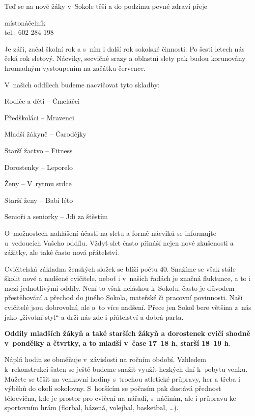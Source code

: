 \documentclass[11pt]{article}
\begin{document}
Teď se na nové žáky v~Sokole těší a do podzimu pevné zdraví přeje

\signature{Jiří Novák (Jirkan)}{místonáčelník\\tel.: 602 284 198}

\vspace*{24pt}

Je září, začal školní rok a s~ním i další rok sokolské činnosti. Po šesti letech nás čeká rok sletový.
Nácviky, secvičné srazy a oblastní slety pak budou korunovány hromadným vystoupením na
začátku července.

\vspace*{6pt}\noindent
V~našich oddílech budeme nacvičovat tyto skladby:

Rodiče a děti –⁠ Čmeláčci

Předškoláci –⁠ Mravenci

Mladší žákyně – Čarodějky

Starší žactvo – Fitness

Dorostenky – Leporelo

Ženy – V~rytmu srdce

Starší ženy – Babí léto

Senioři a seniorky – Jdi za štěstím

\vspace*{6pt}\noindent
O~možnostech nahlášení účasti na sletu a formě nácviků se informujte u~vedoucích Vašeho oddílu. Vždyť slet často přináší nejen nové zkušenosti a zážitky, ale také často nová přátelství.

Cvičitelská základna ženských složek se blíží počtu 40. Snažíme se však stále školit nové a nadšené cvičitele, neboť i v~našich řadách je značná fluktuace, a to i mezi jednotlivými oddíly. Není to však neláskou k~Sokolu, často je důvodem přestěhování a přechod do jiného Sokola, mateřské či pracovní povinnosti. Naši cvičitelé jsou dobrovolní, ale o~to více nadšení. Přece jen Sokol bere většina z~nás jako „životní styl“ a drží nás zde i přátelství a dobrá parta.

\signature{Alena Krásová (Ája)}{}

\vspace*{18pt}

\textbf{Oddíly mladších žákyň a také starších žákyň a dorostenek cvičí shodně v~pondělky a čtvrtky, a to mladší v~čase 17–18 h, starší 18–19 h}.

Náplň hodin se obměňuje v~závislosti na ročním období. Vzhledem k~rekonstrukci šaten se ještě budeme snažit využít hezkých dní k~pobytu venku. Můžete se těšit na venkovní hodiny s~trochou atletické průpravy, her a třeba i výběhů do okolí sokolovny. S~horšícím se počasím pak dostává přednost tělocvična, kde je prostor pro cvičení na nářadí, s~náčiním, ale i průpravu ke sportovním hrám (florbal, házená, volejbal, basketbal, …).
\end{document}
